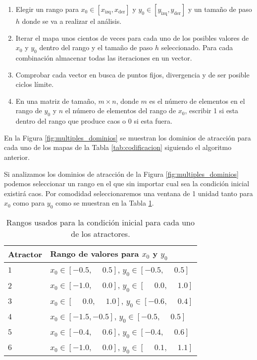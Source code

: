         \begin{enumerate}
            \item Elegir un rango para $x_{0} \in [x_{\text{izq}}, x_{\text{der}}]$ y $y_{0} \in [y_{\text{izq}}, y_{\text{der}}]$ y un tamaño de paso $h$ donde se va a realizar el análisis.
            \item Iterar el mapa unos cientos de veces para cada uno de los posibles valores de $x_{0}$ y $y_{0}$ dentro del rango y el tamaño de paso $h$ seleccionado. Para cada combinación almacenar todas las iteraciones en un vector.
            \item Comprobar cada vector en busca de puntos fijos, divergencia y de ser posible ciclos límite.
            \item En una matriz de tamaño, $m \times n$, donde $m$ es el número de elementos en el rango de $y_{0}$ y $n$ el número de elementos del rango de $x_{0}$, escribir 1 si esta dentro del rango que produce caos o $0$ si esta fuera.
        \end{enumerate}

       En la Figura \ref{fig:multiples_dominios} se muestran los dominios de atracción para cada uno de los mapas de la Tabla \ref{tab:codificacion} siguiendo el algoritmo anterior.

       Si analizamos los dominios de atracción de la Figura \ref{fig:multiples_dominios} podemos seleccionar un rango en el que sin importar cual sea la condición inicial existirá caos. Por comodidad seleccionaremos una ventana de 1 unidad tanto para $x_{0}$ como para $y_{0}$ como se muestran en la Tabla \ref{tab:rangos_mapas}. 

        \begin{table}[htbp]
            \centering
            \caption{Rangos usados para la condición inicial para cada uno de los atractores.}
            \begin{tabular}{|l|l|}
                \hline
                \rowcolor{lightgray} Atractor  & Rango de valores para $x_{0}$ y $y_{0}$ \\
                \hline
                $1$  & $x_{0} \in [-0.5, \phantom{-} 0.5]$, $y_{0} \in [-0.5, \phantom{-}0.5]$ \\
                \hline
                $2$  & $x_{0} \in [-1.0, \phantom{-} 0.0]$, $y_{0} \in [\phantom{-}0.0, \phantom{-}1.0]$ \\
                \hline
                $3$  & $x_{0} \in [\phantom{-}0.0, \phantom{-} 1.0]$, $y_{0} \in [-0.6, \phantom{-}0.4]$ \\
                \hline
                $4$  & $x_{0} \in [-1.5, -0.5]$, $y_{0} \in [-0.5, \phantom{-}0.5]$ \\
                \hline
                $5$  & $x_{0} \in [-0.4, \phantom{-}0.6]$, $y_{0} \in [-0.4, \phantom{-}0.6]$ \\
                \hline
                $6$  & $x_{0} \in [-1.0, \phantom{-}0.0]$, $y_{0} \in [\phantom{-}0.1, \phantom{-}1.1]$ \\
                \hline
            \end{tabular}
            \label{tab:rangos_mapas}
        \end{table}


